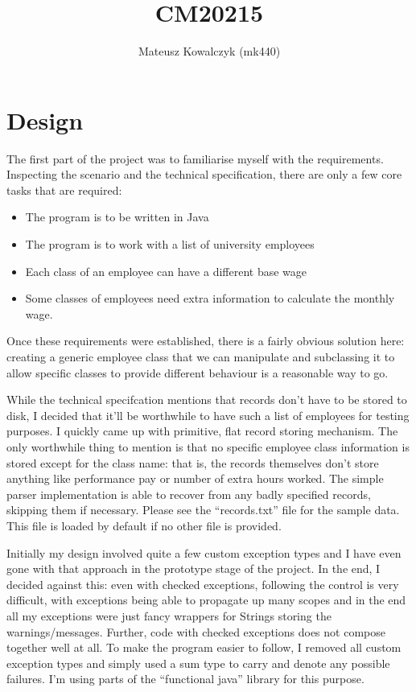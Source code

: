 \documentclass{report}
\begin{document}
\title{CM20215} \author{Mateusz Kowalczyk (mk440)} \maketitle
\section*{Design}

The first part of the project was to familiarise myself with the
requirements. Inspecting the scenario and the technical specification,
there are only a few core tasks that are required:

\begin{itemize}
\item The program is to be written in Java
\item The program is to work with a list of university employees
\item Each class of an employee can have a different base wage
\item Some classes of employees need extra information to calculate
  the monthly wage.
\end{itemize}

Once these requirements were established, there is a fairly obvious
solution here: creating a generic employee class that we can
manipulate and subclassing it to allow specific classes to provide
different behaviour is a reasonable way to go.

While the technical specifcation mentions that records don't have to
be stored to disk, I decided that it'll be worthwhile to have such a
list of employees for testing purposes. I quickly came up with
primitive, flat record storing mechanism. The only worthwhile thing to
mention is that no specific employee class information is stored
except for the class name: that is, the records themselves don't store
anything like performance pay or number of extra hours worked. The
simple parser implementation is able to recover from any badly
specified records, skipping them if necessary. Please see the
``records.txt'' file for the sample data. This file is loaded by
default if no other file is provided.

Initially my design involved quite a few custom exception types and I
have even gone with that approach in the prototype stage of the
project. In the end, I decided against this: even with checked
exceptions, following the control is very difficult, with exceptions
being able to propagate up many scopes and in the end all my
exceptions were just fancy wrappers for Strings storing the
warnings/messages. Further, code with checked exceptions does not
compose together well at all.  To make the program easier to follow, I
removed all custom exception types and simply used a sum type to carry
and denote any possible failures. I'm using parts of the ``functional
java'' library for this purpose.
\end{document}
